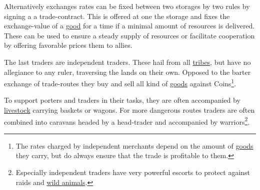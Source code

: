 Alternatively exchanges rates can be fixed between two storages by two rules by
signing a a trade-contract. This is offered at one the storage and fixes the
exchange-value of a \hyperref[ch:Goods]{good} for a time if a minimal amount of
resources is delivered. These can be used to ensure a steady supply of
resources or facilitate cooperation by offering favorable prices them to
allies.

The last traders are independent traders. These hail from all
\hyperref[ch:Tribes]{tribes}, but have no allegiance to any ruler, traversing
the lands on their own. Opposed to the barter exchange of trade-routes they buy
and sell all kind of \hyperref[ch:Goods]{goods} against \glspl{Coin}\footnote{
	The rates charged by independent merchants depend on the amount of
	\hyperref[ch:Goods]{goods} they carry, but do always ensure that the trade is
	profitable to them. }.

To support porters and traders in their tasks, they are often accompanied by
\hyperref[ch:World:Inhabitants:Livestock]{livestock} carrying baskets or
wagons. For more dangerous routes traders are often combined into caravans
headed by a head-trader and accompanied by warriors\footnote{ Especially
	independent traders have very powerful escorts to protect against raids and
	\hyperref[ch:World:Inhabitants:Animals]{wild animals}. }.
